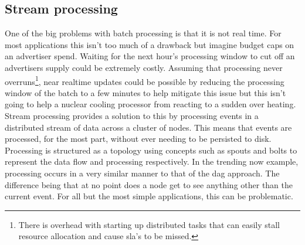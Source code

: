 \documentclass[a4paper,11pt]{scrreprt}
\begin{document}
\subsection{Stream processing}
One of the big problems with batch processing is that it is not real time. For most applications this isn't too much of a drawback but imagine budget caps on an advertiser spend. Waiting for the next hour's processing window to cut off an advertisers supply could be extremely costly. Assuming that processing never overruns\footnote{There is overhead with starting up distributed tasks that can easily stall resource allocation and cause \acrshort{sla}'s to be missed.}, near realtime updates could be possible by reducing the processing window of the batch to a few minutes to help mitigate this issue but this isn't going to help a nuclear cooling processor from reacting to a sudden over heating. Stream processing provides a solution to this by processing events in a distributed stream of data across a cluster of nodes. This means that events are processed, for the most part, without ever needing to be persisted to disk. Processing is structured as a topology using concepts such as spouts and bolts to represent the data flow and processing respectively. In the trending now example, processing occurs in a very similar manner to that of the \acrshort{dag} approach. The difference being that at no point does a node get to see anything other than the current event. For all but the most simple applications, this can be problematic. \\
\end{document}
